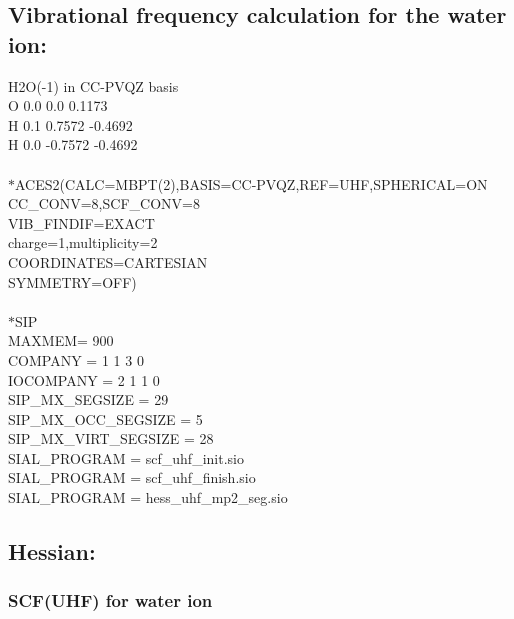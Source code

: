 \documentclass[12pt]{article}
\begin{document}
\newpage 

\noindent 
\subsection{Vibrational frequency calculation for the water ion:}
H2O(-1) in CC-PVQZ basis\\ 
O  0.0  0.0      0.1173\\
H  0.1  0.7572  -0.4692\\
H  0.0 -0.7572  -0.4692\\
\\
$*$ACES2(CALC=MBPT(2),BASIS=CC-PVQZ,REF=UHF,SPHERICAL=ON\\ 
CC\_CONV=8,SCF\_CONV=8\\
VIB\_FINDIF=EXACT\\
charge=1,multiplicity=2\\ 
COORDINATES=CARTESIAN\\
SYMMETRY=OFF)\\
\\
$*$SIP\\
MAXMEM= 900\\
COMPANY   = 1 1 3 0\\
IOCOMPANY = 2 1 1 0\\
SIP\_MX\_SEGSIZE      = 29\\
SIP\_MX\_OCC\_SEGSIZE  = 5\\
SIP\_MX\_VIRT\_SEGSIZE = 28\\
SIAL\_PROGRAM = scf\_uhf\_init.sio\\
SIAL\_PROGRAM = scf\_uhf\_finish.sio\\
SIAL\_PROGRAM = hess\_uhf\_mp2\_seg.sio\\



\newpage 

\noindent 
\subsection{Hessian:}
\subsubsection{SCF(UHF) for water ion}
\end{document}
